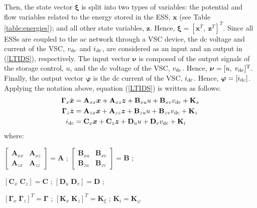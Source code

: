 \documentclass[journal, a4paper]{IEEEtran}
\newcommand{\bfg}[1]{\boldsymbol{#1}}
\begin{document}
Then, the state vector $\bfg \xi$ is split into two types of
variables: the potential and flow variables related to the energy
stored in the ESS, $\bfg x$ (see Table \ref{table:energies}); and all
other state variables, $\bfg z$.  Hence, $\bfg \xi = [\bfg x^T, \;
  \bfg z^T]^T $.  Since all ESSs are coupled to the ac network
through a VSC device, the dc voltage and current of the VSC, $v_{\rm
  dc}$ and $i_{\rm dc}$, are considered as an input and an output in
(\ref{LTIDS}), respectively.  The input vector $\bfg \nu$ is composed
of the output signals of the storage control, $u$, and the dc voltage
of the VSC, $v_{\rm dc}$.  Hence, $\bfg \nu = [u, \; v_{\rm dc}]^{\rm
  T}$.  Finally, the output vector $\boldsymbol{\varphi}$ is the dc
current of the VSC, $i_{\rm dc}$.  Hence, $\boldsymbol{\varphi} =
[i_{\rm dc}]$.  Applying the notation above, equation (\ref{LTIDS}) is
written as follows:
\begin{alignat}{3}
  \nonumber \mathbf{\Gamma}_x \dot{\boldsymbol{x}} &= 
  \mathbf{A}_{xx}\boldsymbol{x} + \mathbf{A}_{xz}\boldsymbol{z} + 
  \mathbf{B}_{xu} u + \mathbf{B}_{xv} v_{\rm dc} + \mathbf{K}_x\\    
  \label{FullGenModel}
  \mathbf{\Gamma}_z \dot{\boldsymbol{z}} &= \mathbf{A}_{zx}\boldsymbol{x} + 
  \mathbf{A}_{zz}\boldsymbol{z} + 
  \mathbf{B}_{zu} u + \mathbf{B}_{zv} v_{\rm dc} + \mathbf{K}_z\\
  \nonumber i_{\rm dc}&= \mathbf{C}_{x}\boldsymbol{x} + 
  \mathbf{C}_{z}\boldsymbol{z} + \mathbf{D}_{u} u + 
  \mathbf{D}_{v} v_{\rm dc} + \mathbf{K}_i
\end{alignat}
where:
\begin{list}{}{}
\item ${\scriptscriptstyle{\begin{bmatrix} \mathbf{A}_{xx} &
        \mathbf{A}_{xz} \\ \mathbf{A}_{zx} &
        \mathbf{A}_{zz} \end{bmatrix}}} = \mathbf{A}$ ;
  \;${\scriptscriptstyle{\begin{bmatrix} \mathbf{B}_{xu} &
        \mathbf{B}_{xv} \\ \mathbf{B}_{zu} &
        \mathbf{B}_{zv} \end{bmatrix}}} = \mathbf{B}$ ; \vspace*{2mm} \item
  $[\mathbf{C}_{x} \; \mathbf{C}_{z}] = \mathbf{C}$ ; \;
  $[\mathbf{D}_{u} \; \mathbf{D}_{v}] = \mathbf{D}$ ; \vspace*{2mm} \item
  $[\mathbf{\Gamma}_{x} \; \mathbf{\Gamma}_{z}]^T =
  \mathbf{\Gamma}$ ; \; $[\mathbf{K}_{x} \; \mathbf{K}_{z}]^T =
  \mathbf{K}_{\xi}$ ; \; $\mathbf{K}_{i} = \mathbf{K}_{\varphi}$
\end{list}	
\end{document}
